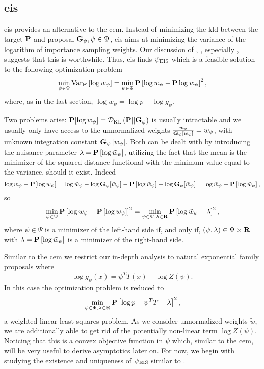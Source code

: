 \subsection{\texorpdfstring{\Acrfull{eis}}{Efficient importance sampling}}
\label{subsec:eis}
\gls{eis} \citep{Richard2007Efficient} provides an alternative to the \gls{cem}. Instead of minimizing the \gls{kld} between the target $\P$ and proposal $\G_{\psi}, \psi \in \Psi$, \gls{eis} aims at minimizing the variance of the logarithm of importance sampling weights. 
Our discussion of \citep{Chatterjee2018Sample}, , especially , suggests that this is worthwhile. 
Thus, \acrshort{eis} finds $\peis$ which is a feasible solution to the following optimization problem
\begin{align}
    \label{eq:eis_optim}
\min_{\psi \in \Psi} \text{Var}_{\P} \left[ \log w_{\psi} \right] = \min_{\psi \in \Psi} \P \left[ \log w_{\psi} - \P \log w_{\psi} \right]^{2},
\end{align}
where, as in the last section, $\log w_{\psi} = \log p - \log g_{\psi}$.

Two problems arise: $\P [\log w_{\psi}] = \Dkl{\P}{\G_{\psi}}$ is usually intractable and we usually only have access to the unnormalized weights $\frac{\tilde w_{\psi}}{\G_{\psi} \left[ w_{\psi} \right]} = w_{\psi}$, with unknown integration constant $\G_{\psi} \left[ w_{\psi} \right]$. Both can be dealt with by introducing the nuisance parameter $\lambda = \P \left[ \log \tilde w_{\psi} \right]$, utilizing the fact that the mean is the minimizer of the squared distance functional with the minimum value equal to the variance, should it exist. Indeed 
$$
    \log w_{\psi} - \P [\log w_{\psi}] = \log \tilde w_{\psi} - \log \G_{\psi} [\tilde w_{\psi}] - \P \left[ \log \tilde w_{\psi} \right] + \log \G_{\psi}[\tilde w_{\psi}] = \log \tilde w_{\psi} - \P \left[ \log \tilde w_{\psi} \right],
$$
so
$$
    \min_{\psi \in \Psi} \P \left[ \log w_{\psi} - \P \left[ \log w_{\psi} \right] \right]^{2} = \min_{\psi \in \Psi, \lambda \in \R} \P \left[ \log \tilde w_{\psi} - \lambda \right]^{2},
$$
where $\psi\in \Psi$ is a minimizer of the left-hand side if, and only if, $(\psi, \lambda) \in \Psi \times \R$ with $\lambda = \P \left[ \log \tilde w_{\psi} \right]$ is a minimizer of the right-hand side. 

Similar to the \gls{cem} we restrict our in-depth analysis to natural exponential family proposals where $$\log g_{\psi}(x) = \psi^{T}T(x) - \log Z(\psi).$$ In this case the optimization problem is reduced to
\begin{align}
    \label{eq:eis_exponential_families}
    \min_{\psi \in \Psi, \lambda \in \R} \P \left[ \log p - \psi^{T}T - \lambda \right]^{2},
\end{align}
a weighted linear least squares problem. As we consider unnormalized weights $\tilde w$, we are additionally able to get rid of the potentially non-linear term $\log Z(\psi)$.
Noticing that this is a convex objective function in $\psi$ which, similar to the \acrshort{cem}, will be very useful to derive asymptotics later on. For now, we begin with studying the existence and uniqueness of $\peis$ similar to .

